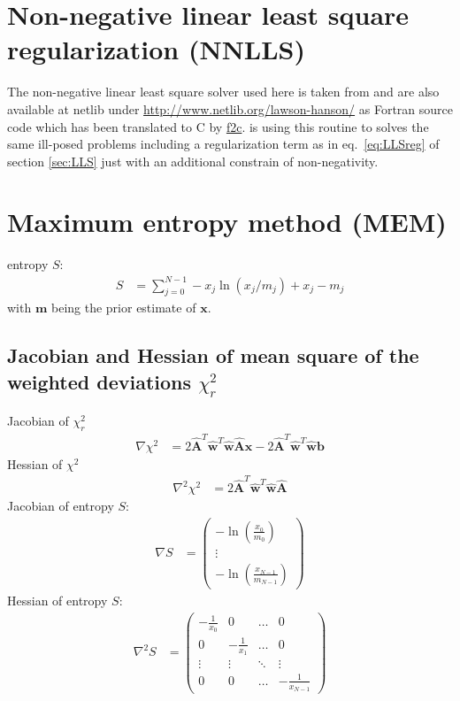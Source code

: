 \section{Non-negative linear least square regularization (NNLLS)}\label{sec:NNLLS}
The non-negative linear least square solver used here is taken from \cite{Lawson1995a} and are also available at netlib under
\url{http://www.netlib.org/lawson-hanson/} as Fortran source code which has been translated to C by \hyperref[https://www.netlib.org/f2c/]{f2c}. \SASfit is using this routine to solves the same ill-posed problems including a regularization term as in eq.\ \ref{eq:LLSreg} of section \ref{sec:LLS} just with an additional constrain of non-negativity.


\clearpage
\section{Maximum entropy method (MEM)}
entropy $S$:
\begin{align}
S&= \sum_{j=0}^{N-1} -x_j\ln\left(x_j/m_j\right) +x_j-m_j
\end{align}
with $\mathbf{m}$ being the prior estimate of $\mathbf{x}$.




\subsection{Jacobian and Hessian of mean square of the weighted deviations $\chi_r^2$}

Jacobian of $\chi_r^2$
\begin{align}
  \nabla \chi^2 &= 2\hat{\mathbf{A}}^T\hat{\mathbf{w}}^T\hat{\mathbf{w}}\hat{\mathbf{A}}\mathbf{x}-2\hat{\mathbf{A}}^T\hat{\mathbf{w}}^T\hat{\mathbf{w}}\mathbf{b}
\end{align}
Hessian of $\chi^2$
\begin{align}
  \nabla^2 \chi^2 &= 2\hat{\mathbf{A}}^T\hat{\mathbf{w}}^T\hat{\mathbf{w}}\hat{\mathbf{A}}
\end{align}
Jacobian of entropy $S$:
\begin{align}
  \nabla  S &= \begin{pmatrix}
    -\ln \left(\frac{x_0}{m_0}\right) \\
   \vdots \\
    -\ln \left(\frac{x_{N-1}}{m_{N-1}}\right)
  \end{pmatrix}
\end{align}
Hessian of entropy $S$:
\begin{align}
  \nabla^2  S &=
  \begin{pmatrix}
    -\frac{1}{x_0} & 0 & \dots & 0 \\
    0 & -\frac{1}{x_1} & \dots & 0 \\
    \vdots & \vdots & \ddots & \vdots \\
    0 & 0 & \dots & -\frac{1}{x_{N-1}}
  \end{pmatrix}
\end{align}


